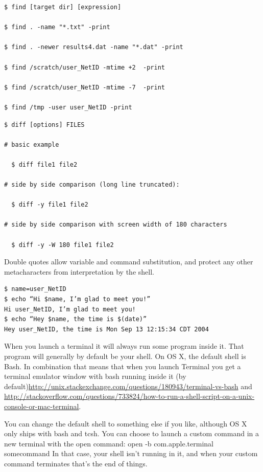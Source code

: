 \begin{Verbatim}
$ find [target dir] [expression]

$ find . -name "*.txt" -print
 
$ find . -newer results4.dat -name "*.dat" -print
 
$ find /scratch/user_NetID -mtime +2  -print
 
$ find /scratch/user_NetID -mtime -7  -print
 
$ find /tmp -user user_NetID -print
\end{Verbatim}

\begin{verbatim}
$ diff [options] FILES
 
# basic example
 
  $ diff file1 file2
 
# side by side comparison (long line truncated):
 
  $ diff -y file1 file2
 
# side by side comparison with screen width of 180 characters
 
  $ diff -y -W 180 file1 file2

\end{verbatim}


Double quotes allow variable and command substitution, and protect any other metacharacters from interpretation by the shell.

\begin{verbatim}
$ name=user_NetID
$ echo “Hi $name, I’m glad to meet you!”
Hi user_NetID, I’m glad to meet you!
$ echo “Hey $name, the time is $(date)”
Hey user_NetID, the time is Mon Sep 13 12:15:34 CDT 2004

\end{verbatim}


When you launch a terminal it will always run some program inside it. That program will generally by default be your shell. On OS X, the default shell is Bash. In combination that means that when you launch Terminal you get a terminal emulator window with bash running inside it (by default)\url{http://unix.stackexchange.com/questions/180943/terminal-vs-bash} and \url{http://stackoverflow.com/questions/733824/how-to-run-a-shell-script-on-a-unix-console-or-mac-terminal}.

You can change the default shell to something else if you like, although OS X only ships with bash and tcsh. You can choose to launch a custom command in a new terminal with the open command:
open -b com.apple.terminal somecommand
In that case, your shell isn't running in it, and when your custom command terminates that's the end of things.

